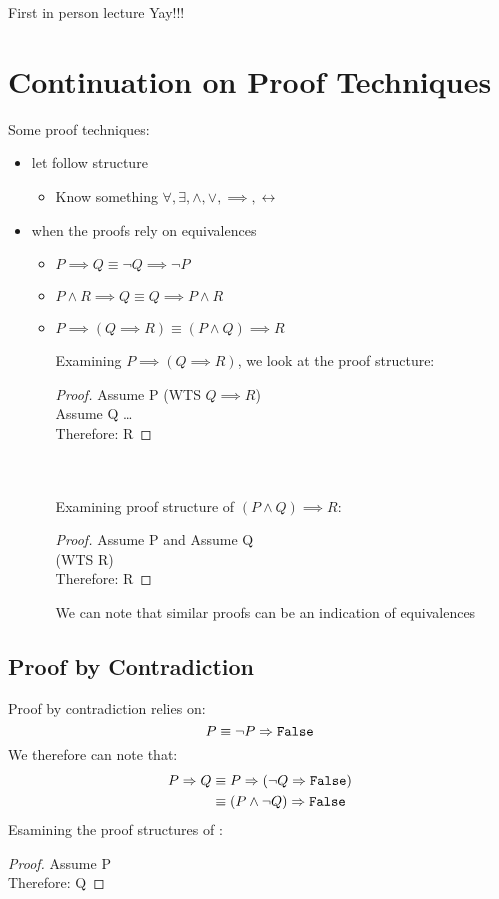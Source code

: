 \documentclass[12pt, letterpaper, twoside]{article}
\begin{document}
First in person lecture Yay!!!


\section{Continuation on Proof Techniques}
Some proof techniques:
\begin{itemize}
    \item {} let follow structure
    \begin{itemize}
        \item Know something $\forall, \exists, \land, \lor, \implies, \leftrightarrow$
    \end{itemize}
    \item {} when the proofs rely on equivalences
    \begin{itemize}
        \item $P \implies Q \equiv \lnot Q \implies \lnot P$
        \item $P \land R \implies Q \equiv Q \implies P \land R$
        \item $P \implies (Q \implies R) \equiv (P \land Q) \implies R$
        
        Examining $P \implies (Q \implies R)$, we look at the proof structure:
        \begin{proof}
            Assume P
            (WTS $Q \implies R$)\\
            Assume Q \dots \\
            Therefore: R
        \end{proof}
        \\
        \\
        Examining proof structure of $(P \land Q) \implies R$:

        \begin{proof}
            Assume P and Assume Q\\
            (WTS R)\\
            Therefore: R
        \end{proof}

        We can note that similar proofs can be an indication of equivalences
    \end{itemize}
\end{itemize}

\subsection{Proof by Contradiction}
Proof by contradiction relies on:
$$
P \equiv \lnot P \mathrel{\Rightarrow} \texttt{False}
$$
We therefore can note that:
\begin{align*}
    P \mathrel{\Rightarrow} Q &\equiv P \mathrel{\Rightarrow} (\lnot Q \mathrel{\Rightarrow} \texttt{False})\\
    &\equiv (P \land \lnot Q) \mathrel{\Rightarrow} \texttt{False}
\end{align*}
Esamining the proof structures of  :\\
\begin{proof}
    Assume P\\
    Therefore: Q
\end{proof}
\end{document}
